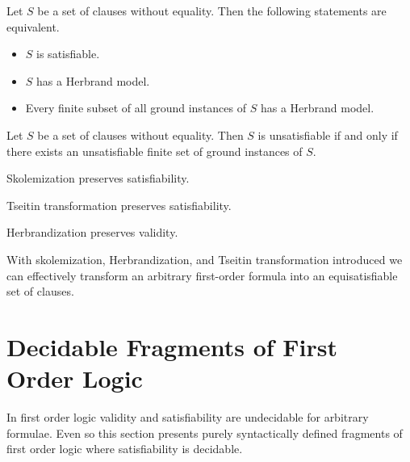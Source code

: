 \begin{theorem}[Herbrand, 1930]\label{the:herbrand}
	Let \( S \) be a set of clauses without equality. Then the following statements are equivalent.
	\begin{itemize}
		\item \( S \) is satisfiable.
		\item \( S \) has a Herbrand model.
		\item Every finite subset of all ground instances of \( S \) has a Herbrand model.
	\end{itemize}
\end{theorem}

\begin{corollary}
	Let \( S \) be a set of clauses without equality.
	Then \( S \) is unsatisfiable if and only if there exists
	an unsatisfiable finite set of ground instances of \( S \).
\end{corollary}

\begin{lemma}
	Skolemization preserves satisfiability.
\end{lemma}

\begin{lemma}
	Tseitin transformation preserves satisfiability.
\end{lemma}

\begin{lemma}
	Herbrandization preserves validity.
\end{lemma}

\begin{lemma}
With skolemization, Herbrandization, and Tseitin transformation introduced 
we can effectively transform an arbitrary first-order formula 
into an equisatisfiable set of clauses.
\end{lemma}


\section{Decidable Fragments of First Order Logic}\label{sec:decidable:fol:fragments}

In first order logic validity and satisfiability are undecidable for arbitrary formulae.
Even so this section presents purely syntactically defined fragments
of first order logic where satisfiability is decidable.%

